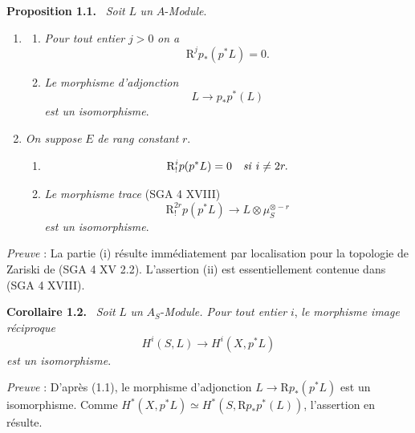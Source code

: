 \documentclass[11pt]{article}
\newenvironment{statement}[1]{\par\medskip\noindent\textbf{#1.}\ }{\par\medskip}
\newcommand{\R}{\mathrm{R}}\newcommand{\RHomCore}{\mathrm{RHom}}
\providecommand{\R}{\mathrm R}
\begin{document}
\begin{statement}{Proposition 1.1}
\emph{Soit} $L$ \emph{un} $A$-\emph{Module}.
\begin{enumerate}[label=(\roman*)]
\item
\begin{enumerate}[label=\alph*)]
\item \emph{Pour tout entier} $j>0$ \emph{on a}
\[
\mathrm{R}^j p_*(p^*L)=0.
\]
\item \emph{Le morphisme d'adjonction}
\[
L\longrightarrow p_*p^*(L)
\]
\emph{est un isomorphisme}.
\end{enumerate}
\item \emph{On suppose} $E$ \emph{de rang constant} $r$.
\begin{enumerate}[label=\alph*)]
\item
\[
\mathrm{R}_!^i p(p^*L)=0\quad\text{\emph{si} }i\ne 2r.
\]
\item \emph{Le morphisme trace} (SGA 4 XVIII)
\[
\mathrm{R}_!^{2r}p(p^*L)\longrightarrow L\otimes\mu_S^{\otimes -r}
\]
\emph{est un isomorphisme}.
\end{enumerate}
\end{enumerate}
\end{statement}

\emph{Preuve} : La partie (i) résulte immédiatement par localisation pour la topologie de Zariski de (SGA 4 XV 2.2). L'assertion (ii) est essentiellement contenue dans (SGA 4 XVIII).

\begin{statement}{Corollaire 1.2}
\emph{Soit} $L$ \emph{un} $A_S$-\emph{Module. Pour tout entier} $i$, \emph{le morphisme image réciproque}
\[
H^i(S,L)\longrightarrow H^i(X,p^*L)
\]
\emph{est un isomorphisme}.
\end{statement}

\emph{Preuve} : D'après (1.1), le morphisme d'adjonction $L\to \R p_*(p^*L)$ est un isomorphisme. Comme $H^*(X,p^*L)\simeq H^*(S,\R p_*p^*(L))$, l'assertion en résulte.
\end{document}
